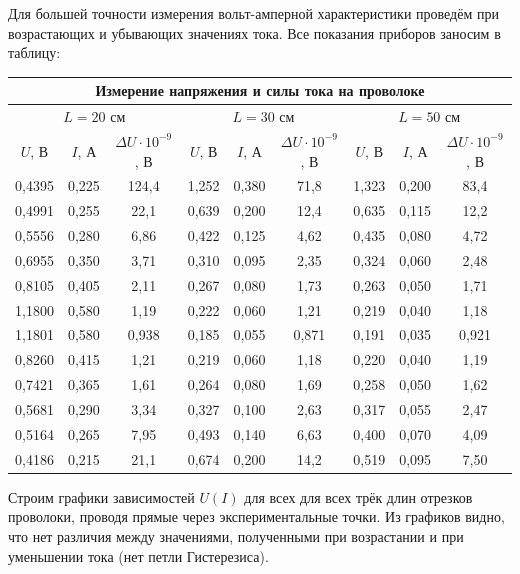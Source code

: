 \documentclass[a4paper, 12pt]{article} %
\begin{document}
Для большей точности измерения вольт-амперной характеристики проведём при возрастающих и убывающих значениях тока. Все показания приборов заносим в таблицу:
\begin{center}
\begin{tabular}{|c|c|c|c|c|c|c|c|c|}
\hline
\multicolumn{9}{|c|}{Измерение напряжения и силы тока на проволоке}                                                                                \\ \hline
\multicolumn{3}{|c|}{$L = 20$ см} & \multicolumn{3}{c|}{$L = 30$ см} & \multicolumn{3}{c|}{$L = 50$ см}                         \\ \hline
$U$, В & $I$, А & $\Delta U \cdot 10^{-9}$, В & $U$, В & $I$, А & $\Delta U \cdot 10^{-9}$, В & $U$, В & $I$, А & $\Delta U \cdot 10^{-9}$, В \\ \hline
0,4395&0,225&124,4&1,252&0,380&71,8  &1,323&0,200&83,4  \\ \hline  
0,4991&0,255& 22,1&0,639&0,200&12,4  &0,635&0,115&12,2  \\ \hline
0,5556&0,280& 6,86&0,422&0,125&4,62  &0,435&0,080&4,72  \\ \hline
0,6955&0,350& 3,71&0,310&0,095&2,35  &0,324&0,060&2,48  \\ \hline
0,8105&0,405& 2,11&0,267&0,080&1,73  &0,263&0,050&1,71  \\ \hline
1,1800&0,580& 1,19&0,222&0,060&1,21  &0,219&0,040&1,18  \\ \hline
1,1801&0,580&0,938&0,185&0,055&0,871 &0,191&0,035&0,921  \\ \hline
0,8260&0,415& 1,21&0,219&0,060&1,18  &0,220&0,040&1,19  \\ \hline
0,7421&0,365& 1,61&0,264&0,080&1,69  &0,258&0,050&1,62  \\ \hline
0,5681&0,290& 3,34&0,327&0,100&2,63  &0,317&0,055&2,47  \\ \hline
0,5164&0,265& 7,95&0,493&0,140&6,63  &0,400&0,070&4,09  \\ \hline
0,4186&0,215& 21,1&0,674&0,200&14,2  &0,519&0,095&7,50  \\ \hline
\end{tabular}
\end{center}

Строим графики зависимостей $U(I)$ для всех для всех трёк длин отрезков проволоки, проводя прямые через экспериментальные точки. Из графиков видно, что нет различия между значениями, полученными при возрастании и при уменьшении тока (нет петли Гистерезиса).
\end{document}

